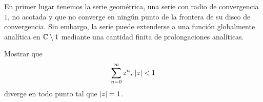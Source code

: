 
En primer lugar tenemos la serie geométrica, una serie con radio de convergencia $1$, no acotada y que no converge en ningún punto de la frontera de su disco de convergencia. Sin embargo, la serie puede extenderse a una función globalmente analítica en $\mathbb{C} \setminus{1}$ mediante una cantidad finita de prolongaciones analíticas. \\


\begin{example}
    Mostrar que
    \begin{equation*}
        \sum_{n=0}^{\infty} z^n, \, \left\lvert z\right\rvert < 1
    \end{equation*}
    diverge en todo punto tal que $\left\lvert z\right\rvert = 1$.
\end{example}

